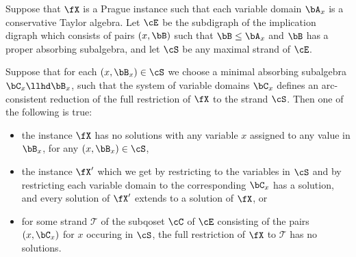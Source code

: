 \begin{thm}\label{thm-rectangularity-application} Suppose that $\fX$ is a Prague instance such that each variable domain $\bA_x$ is a conservative Taylor algebra. Let $\cE$ be the subdigraph of the implication digraph which consists of pairs $(x,\bB)$ such that $\bB \le \bA_x$ and $\bB$ has a proper absorbing subalgebra, and let $\cS$ be any maximal strand of $\cE$.

Suppose that for each $(x,\bB_x) \in \cS$ we choose a minimal absorbing subalgebra $\bC_x \llhd \bB_x$, such that the system of variable domains $\bC_x$ defines an arc-consistent reduction of the full restriction of $\fX$ to the strand $\cS$. Then one of the following is true:
\begin{itemize}
\item the instance $\fX$ has no solutions with any variable $x$ assigned to any value in $\bB_x$, for any $(x,\bB_x) \in \cS$,
\item the instance $\fX'$ which we get by restricting to the variables in $\cS$ and by restricting each variable domain to the corresponding $\bC_x$ has a solution, and every solution of $\fX'$ extends to a solution of $\fX$, or
\item for some strand $\mathcal{T}$ of the subqoset $\cC$ of $\cE$ consisting of the pairs $(x,\bC_x)$ for $x$ occuring in $\cS$, the full restriction of $\fX$ to $\mathcal{T}$ has no solutions.
\end{itemize}
\end{thm}

